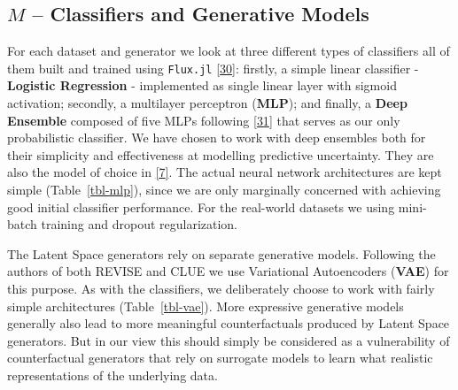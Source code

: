 \documentclass[
  conference]{IEEEtran}
\begin{document}
\hypertarget{sec-empirical-classifiers}{%
\subsection{\texorpdfstring{\(M\) -- Classifiers and Generative
Models}{M -- Classifiers and Generative Models}}\label{sec-empirical-classifiers}}

For each dataset and generator we look at three different types of
classifiers all of them built and trained using \texttt{Flux.jl}
\protect\hyperlink{ref-innes2018fashionable}{{[}30{]}}: firstly, a
simple linear classifier - \textbf{Logistic Regression} - implemented as
single linear layer with sigmoid activation; secondly, a multilayer
perceptron (\textbf{MLP}); and finally, a \textbf{Deep Ensemble}
composed of five MLPs following
\protect\hyperlink{ref-lakshminarayanan2016simple}{{[}31{]}} that serves
as our only probabilistic classifier. We have chosen to work with deep
ensembles both for their simplicity and effectiveness at modelling
predictive uncertainty. They are also the model of choice in
\protect\hyperlink{ref-schut2021generating}{{[}7{]}}. The actual neural
network architectures are kept simple (Table~\ref{tbl-mlp}), since we
are only marginally concerned with achieving good initial classifier
performance. For the real-world datasets we using mini-batch training
and dropout regularization.

The Latent Space generators rely on separate generative models.
Following the authors of both REVISE and CLUE we use Variational
Autoencoders (\textbf{VAE}) for this purpose. As with the classifiers,
we deliberately choose to work with fairly simple architectures
(Table~\ref{tbl-vae}). More expressive generative models generally also
lead to more meaningful counterfactuals produced by Latent Space
generators. But in our view this should simply be considered as a
vulnerability of counterfactual generators that rely on surrogate models
to learn what realistic representations of the underlying data.
\end{document}
